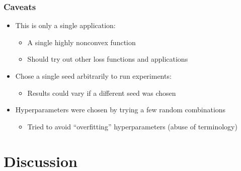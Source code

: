 \documentclass{beamer}
\begin{document}
\begin{frame}
\frametitle{Caveats}
\begin{itemize}
  \item<1-> This is only a single application:
  \begin{itemize}
    \item<1-> A single highly nonconvex function
    \item<1-> Should try out other loss functions and applications
  \end{itemize}
  \item<2-> Chose a single seed arbitrarily to run experiments:
  \begin{itemize}
    \item<2-> Results could vary if a different seed was chosen
  \end{itemize}
  \item<3-> Hyperparameters were chosen by trying a few random combinations
  \begin{itemize}
    \item<3-> Tried to avoid ``overfitting'' hyperparameters (abuse of terminology)
  \end{itemize}
\end{itemize}
\end{frame}

\section{Discussion}
\end{document}
